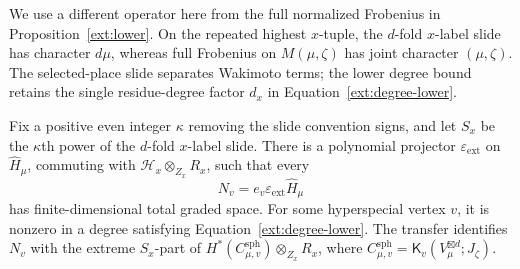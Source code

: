 We use a different operator here from the full normalized Frobenius
in Proposition~\ref{ext:lower}.  On the repeated highest $x$-tuple,
the $d$-fold $x$-label slide has character $d\mu$, whereas full
Frobenius on $M(\mu,\zeta)$ has joint character $(\mu,\zeta)$.
The selected-place slide separates Wakimoto terms; the lower degree
bound retains the single residue-degree factor $d_x$ in
Equation~\eqref{ext:degree-lower}.

\begin{proposition}\label{ext:extreme-transfer}
 Fix a positive even integer $\kappa$ removing the slide convention
 signs, and let $S_x$ be the $\kappa$th power of the $d$-fold
 $x$-label slide.  There is a polynomial projector
 $\varepsilon_{\mathrm{ext}}$ on $\widehat H_\mu$, commuting with
 $\mathcal H_x\otimes_{Z_x}R_x$, such that every
 \[
        N_v=e_v\varepsilon_{\mathrm{ext}}\widehat H_\mu
 \]
 has finite-dimensional total graded space.  For some hyperspecial
 vertex $v$, it is nonzero in a degree satisfying
 Equation~\eqref{ext:degree-lower}.  The transfer identifies $N_v$
 with the extreme $S_x$-part of
 $H^*(C_{\mu,v}^{\mathrm{sph}})\otimes_{Z_x}R_x$, where
 $C_{\mu,v}^{\mathrm{sph}}
   =\mathsf K_v(V_\mu^{\boxtimes d};J_\zeta)$.
\end{proposition}

